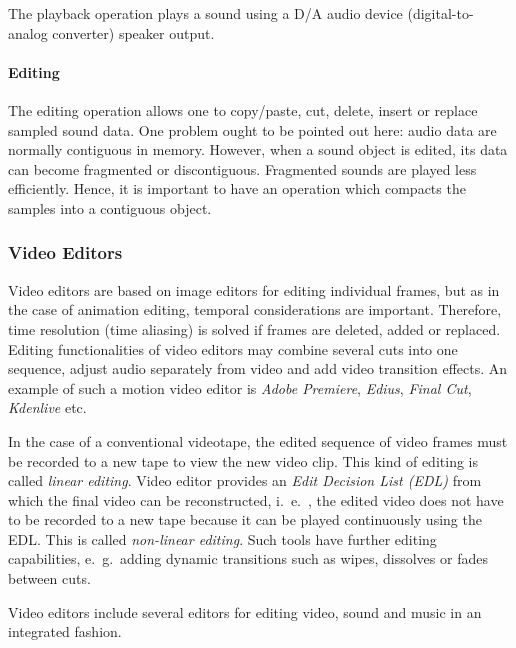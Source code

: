 The playback operation plays a sound using a D/A audio device (digital-to-analog converter) speaker output.

\paragraph*{Editing}
The editing operation allows one to copy/paste, cut, delete, insert or replace sampled sound data. One problem ought to be pointed out here: audio data are normally contiguous in memory. However, when a sound object is edited, its data can become fragmented or discontiguous. Fragmented sounds are played less efficiently. Hence, it is important to have an operation which compacts the samples into a contiguous object.


\subsubsection{Video Editors}
Video editors are based on image editors for editing individual frames, but as in the case of animation editing, temporal considerations are important. Therefore, time resolution (time aliasing) is solved if frames are deleted, added or replaced. Editing functionalities of video editors may combine several cuts into one sequence, adjust
audio separately from video and add video transition effects. An example of such a motion video editor is \textit{Adobe Premiere}, \textit{Edius}, \textit{Final Cut}, \textit{Kdenlive} etc.

In the case of a conventional videotape, the edited sequence of video frames must be recorded to a new tape to view the new video clip. This kind of editing is called \textit{linear editing}. Video editor provides an \textit{Edit Decision List (EDL)} from which the final video can be reconstructed, i.\ e.\ , the edited video does not have to be recorded to a new tape because it can be played continuously using the EDL. This is called \textit{non-linear editing}. Such tools have further editing capabilities, e.\ g.\, adding dynamic transitions such as wipes, dissolves or fades between cuts.

Video editors include several editors for editing video, sound and music in an integrated fashion.

\newpage\thispagestyle{empty}